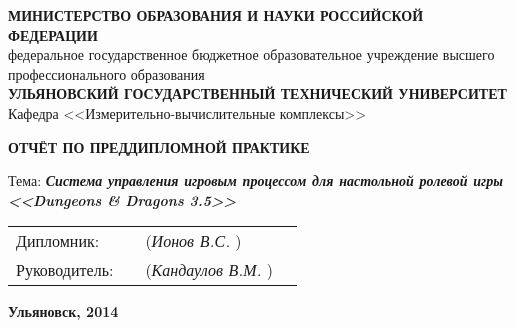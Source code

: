 
\sffamily


\small
\begin{center}

\MakeTextUppercase{\textbf{министерство образования и науки российской федерации}}\\
федеральное государственное бюджетное образовательное учреждение высшего профессионального образования\\
\MakeTextUppercase{\textbf{ульяновский государственный технический университет}}\\[0.7cm]

Кафедра <<Измерительно-вычислительные комплексы>>\\[0.7cm]

\vspace{1.5cm}

\LARGE

\textbf{ОТЧЁТ ПО ПРЕДДИПЛОМНОЙ ПРАКТИКЕ}

\vspace{1.5cm}

\normalsize

Тема: \textbf{\textit{\emph{Система управления игровым процессом для настольной ролевой игры <<Dungeons \& Dragons 3.5>>}}}

\vspace{2cm}

\begin{tabular}{l m{6cm} m{5cm} l}
    Дипломник:    & \emph{\hfill} & (\emph{Ионов В.С.\hfill}     )  & \\[0.5cm]
    Руководитель: & \emph{\hfill} & (\emph{Кандаулов В.М.\hfill} )  & \\[0.5cm]
\end{tabular}

\vfill

\textbf{Ульяновск, 2014}

\end{center}


\restoregeometry
